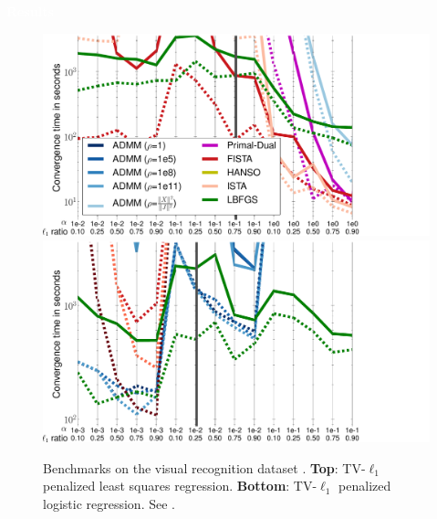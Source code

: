 \documentclass[french]{STIC_poster}
\begin{document}
\begin{frame}[t]
\begin{columns}[t]
\begin{column}{.48\linewidth}
\begin{abox}{\textbf{\textcolor{white}{Results}}}
                            \begin{figure}
                              \includegraphics[width=1.2\linewidth]{bench/haxby_mse.pdf}%
                              \hspace{-.09\linewidth}%
                              \includegraphics[width=1.2\linewidth]{bench/haxby_lr.pdf}
                              \caption{Benchmarks on the visual recognition dataset \textcolor{cyan}{\cite{haxby2001}}. \textbf{Top}: TV-$\ell_1$ penalized least squares regression.
                                \textbf{Bottom}: TV-$\ell_1$ penalized logistic regression. See \textcolor{cyan}{\cite{dohmatob2014benchmarking}}.}
                              \label{Fig:MSEtimes}
                            \end{figure}

\end{abox}
\end{column}
\end{columns}
\end{frame}
\end{document}

